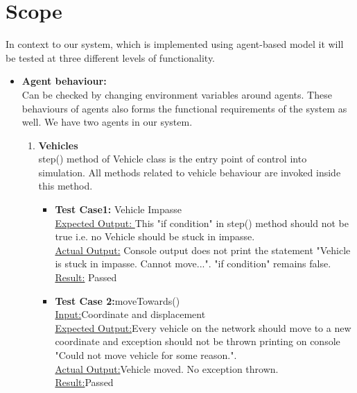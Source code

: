 \documentclass[11pt]{article}
\begin{document}
\section{Scope}
	In context to our system, which is implemented using agent-based model it will be tested at three different levels of functionality.

\begin{itemize}
	\subsection{Levels of Functionalities}
	\item \textbf{Agent behaviour: }\hfill \\
	Can be checked by changing environment variables around agents. These behaviours of agents also forms the functional requirements of the system as well. We have two agents in our system. \begin{enumerate}

	\item \textbf{Vehicles}\hfill \\
	step() method of Vehicle class is the entry point of control into simulation. All methods related to vehicle behaviour are invoked inside this method.\hfill \\

	\begin{itemize}
	\item \textbf{Test Case1:} Vehicle Impasse\hfill \\
		\underline{Expected Output: }This "if condition" in step() method should not be true i.e. no Vehicle 	should be stuck in impasse.\hfill \\
		\underline{Actual Output:} Console output does not print the statement "Vehicle is stuck in 		impasse. Cannot move...". "if condition" remains false.\hfill \\
		\underline{Result:} Passed\hfill \\

	\item \textbf{Test Case 2:}moveTowards()\hfill \\
		\underline{Input:}Coordinate and displacement\hfill \\
		\underline{Expected Output:}Every vehicle on the network should move to a new coordinate and exception should not be thrown printing on console "Could not move vehicle for some reason.".	\hfill \\
		 \underline{Actual Output:}Vehicle moved. No exception thrown.\hfill \\
		\underline{Result:}Passed
	

\end{itemize}
\end{enumerate}
\end{itemize}
\end{document}
